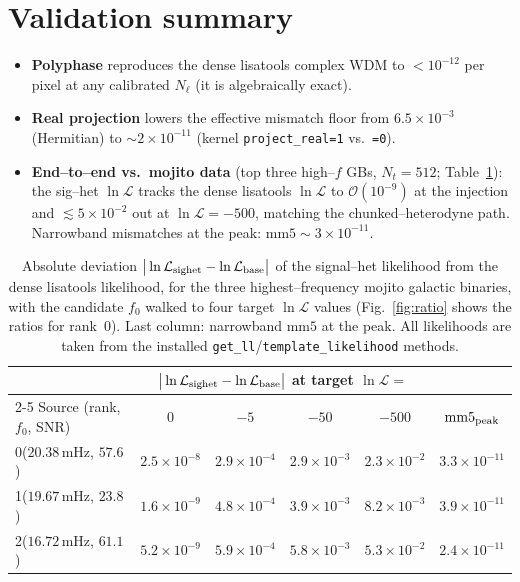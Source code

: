 \documentclass[11pt]{article}
\newcommand{\Nt}{N_t}
\newcommand{\Ntl}{N_\ell}
\begin{document}
\section{Validation summary}

\begin{itemize}\itemsep2pt
\item \textbf{Polyphase} reproduces the dense lisatools complex WDM to
$<10^{-12}$ per pixel at any calibrated $\Ntl$ (it is algebraically exact).
\item \textbf{Real projection} lowers the effective mismatch floor from
$6.5\times10^{-3}$ (Hermitian) to $\sim\!2\times10^{-11}$ (kernel \texttt{project\_real=1} vs.\ \texttt{=0}).
\item \textbf{End--to--end vs.\ mojito data} (top three high--$f$ GBs,
$\Nt=512$; Table~\ref{tab:mojito}): the sig--het $\ln\mathcal L$ tracks the dense
lisatools $\ln\mathcal L$ to $\mathcal{O}(10^{-9})$ at the injection and
$\lesssim5\times10^{-2}$ out at $\ln\mathcal L=-500$, matching the
chunked--heterodyne path. Narrowband mismatches at the peak:
$\mathrm{mm5}\sim3\times10^{-11}$.
\end{itemize}

\begin{table}[htbp]
\centering
\caption{Absolute deviation $\big|\ln\mathcal L_{\rm sighet}-\ln\mathcal
L_{\rm base}\big|$ of the signal--het likelihood from the dense lisatools
likelihood, for the three highest--frequency mojito galactic binaries, with the
candidate $f_0$ walked to four target $\ln\mathcal L$ values
(Fig.~\ref{fig:ratio} shows the ratios for rank~0). Last column: narrowband
$\mathrm{mm5}$ at the peak. All likelihoods are taken from the installed
\texttt{get\_ll}/\texttt{template\_likelihood} methods.}
\label{tab:mojito}
\begin{tabular}{lccccc}
\toprule
& \multicolumn{4}{c}{$\big|\ln\mathcal L_{\rm sighet}-\ln\mathcal L_{\rm base}\big|$ at target $\ln\mathcal L=$} & \\
\cmidrule(lr){2-5}
Source (rank, $f_0$, SNR) & $0$ & $-5$ & $-50$ & $-500$ & $\mathrm{mm5}_{\rm peak}$ \\
\midrule
0\quad ($20.38$\,mHz, $57.6$) & $2.5\times10^{-8}$ & $2.9\times10^{-4}$ & $2.9\times10^{-3}$ & $2.3\times10^{-2}$ & $3.3\times10^{-11}$ \\
1\quad ($19.67$\,mHz, $23.8$) & $1.6\times10^{-9}$ & $4.8\times10^{-4}$ & $3.9\times10^{-3}$ & $8.2\times10^{-3}$ & $3.9\times10^{-11}$ \\
2\quad ($16.72$\,mHz, $61.1$) & $5.2\times10^{-9}$ & $5.9\times10^{-4}$ & $5.8\times10^{-3}$ & $5.3\times10^{-2}$ & $2.4\times10^{-11}$ \\
\bottomrule
\end{tabular}
\end{table}
\end{document}
